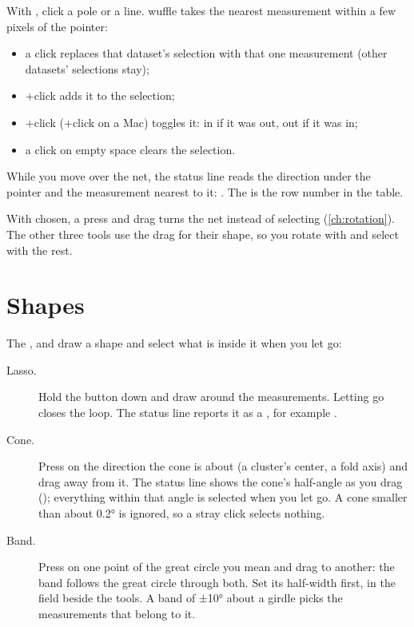 With , click a pole or a line. wuffle takes the nearest measurement within a few pixels of the
pointer:

\begin{itemize}
\item a click replaces that dataset's selection with that one measurement (other datasets' selections stay);
\item {}+click adds it to the selection;
\item {}+click (+click on a Mac) toggles it: in if it was out, out if it was in;
\item a click on empty space clears the selection.
\end{itemize}

While you move over the net, the status line reads the direction under the pointer and the measurement
nearest to it: . The \code{\#} is the
row number in the table.

\begin{note}
With  chosen, a press and drag turns the net instead of selecting (\cref{ch:rotation}). The
other three tools use the drag for their shape, so you rotate with  and select with the rest.
\end{note}

\section{Shapes}\label{sec:shapes}


The ,  and  draw a shape and select what is inside it when you let go:

\begin{description}
\item[Lasso.] Hold the button down and draw around the measurements. Letting go closes the loop. The status
line reports it as a , for example .
\item[Cone.] Press on the direction the cone is about (a cluster's center, a fold axis) and drag away from
it. The status line shows the cone's half-angle as you drag (); everything
within that angle is selected when you let go. A cone smaller than about 0.2° is ignored, so a stray click
selects nothing.
\item[Band.] Press on one point of the great circle you mean and drag to another: the band follows the
great circle through both. Set its half-width first, in the field beside the tools. A band of ±10° about
a girdle picks the measurements that belong to it.
\end{description}

